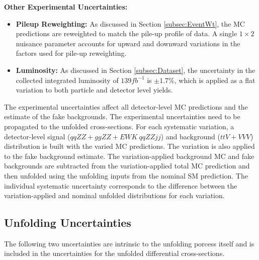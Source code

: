 \textbf{Other Experimental Uncertainties: }
\begin{itemize}
    \item{\textbf{Pileup Reweighting:} As discussed in Section \ref{subsec:EventWt}, the MC predictions are reweighted to match the pile-up profile of data. A single $1\times2$ nuisance parameter accounts for upward and downward variations in the factors used for pile-up reweighting. }
    \item{\textbf{Luminosity:} As discussed in Section \ref{subsec:Dataset}, the uncertainty in the collected integrated luminosity of $139 fb^{-1}$ is $\pm1.7\%$, which is applied as a flat variation to both particle and detector level yields. } 
\end{itemize}

The experimental uncertainties affect all detector-level MC predictions and the estimate of the fake backgrounds. The experimental uncertainties need to be propagated to the unfolded cross-sections. For each systematic variation, a detector-level signal ($qqZZ+ggZZ+EWK~qqZZjj$) and background ($ttV+VVV$) distribution is built with the varied MC predictions. The variation is also applied to the fake background estimate. The variation-applied background MC and fake backgrounds are subtracted from the variation-applied total MC prediction and then unfolded using the unfolding inputs from the nominal SM prediction. The individual systematic uncertainty corresponds to the difference between the variation-applied and nominal unfolded distributions for each variation.  

\subsection{Unfolding Uncertainties}
\label{subsec:UnfoldingUnc}
The following two uncertainties are intrinsic to the unfolding porcess itself and is included in the uncertainties for the unfolded differential cross-sections.

